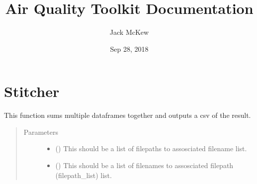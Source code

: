 \documentclass[letterpaper,10pt,english,openany,oneside]{sphinxmanual}
\title{Air Quality Toolkit Documentation}
\date{Sep 28, 2018}
\author{Jack McKew}
\begin{document}
\maketitle
\sphinxtableofcontents
{}\label{\detokenize{index::doc}}



\chapter{Stitcher}
\label{\detokenize{index:stitcher}}\label{\detokenize{index:welcome-to-air-quality-toolkit-s-documentation}}\label{\detokenize{index:module-Stitcher}}

\begin{fulllineitems}
\label{\detokenize{index:Stitcher.Stitcher}}
This function sums multiple dataframes together and outputs a csv of the result.
\begin{quote}\begin{description}
\item[{Parameters}] \leavevmode\begin{itemize}
\item {} 
 (\sphinxstyleliteralemphasis{\sphinxupquote{{[}}}\sphinxstyleliteralemphasis{\sphinxupquote{{]}}}\sphinxstyleliteralemphasis{\sphinxupquote{}}) \textendash{} This should be a list of filepaths to assosciated filename list.

\item {} 
 (\sphinxstyleliteralemphasis{\sphinxupquote{{[}}}\sphinxstyleliteralemphasis{\sphinxupquote{{]}}}\sphinxstyleliteralemphasis{\sphinxupquote{}}) \textendash{} This should be a list of filenames to assosciated filepath (filepath\_list) list.


\end{itemize}
\end{description}
\end{quote}
\end{fulllineitems}
\end{document}
